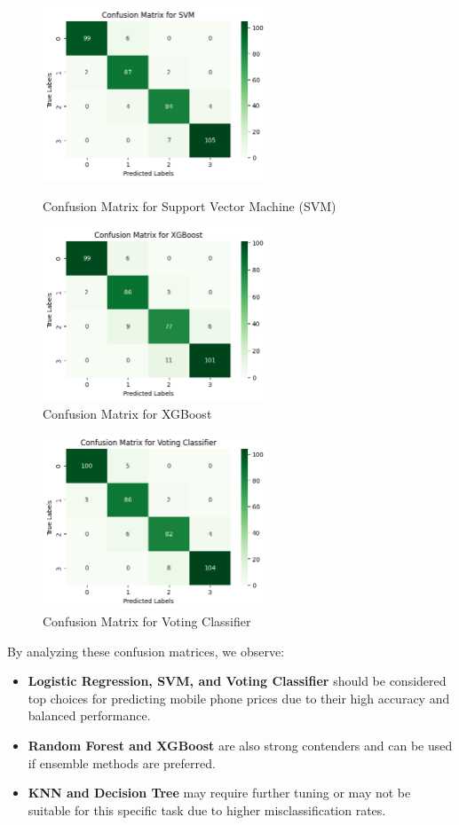 \documentclass[12pt]{report}
\begin{document}
\begin{figure}[H]
    \centering
		\begin{minipage}{0.45\textwidth}
			\centering
			\includegraphics[height=14em]{cmat_SVM.png}
			\caption{Confusion Matrix for Support Vector Machine (SVM)}
			\label{cmat_SVM}
		\end{minipage}
    \hfill
    \begin{minipage}{0.45\textwidth}
        \centering
        \includegraphics[height=14em]{cmat_XG.png}
        \caption{Confusion Matrix for XGBoost}
        \label{cmat_XG}
    \end{minipage}
\end{figure}
\begin{figure}[H]
    \centering
    \includegraphics[height=14em]{cmat_VC.png}
    \caption{Confusion Matrix for Voting Classifier}
    \label{cmat_VC}
\end{figure}

\noindent By analyzing these confusion matrices, we observe:
\vspace{-1.25em}
\begin{itemize}
	\setlength\itemsep{-1.05em}
	\item \textbf{Logistic Regression, SVM, and Voting Classifier} should be considered top choices for predicting mobile phone prices due to their high accuracy and balanced performance.
	\item \textbf{Random Forest and XGBoost} are also strong contenders and can be used if ensemble methods are preferred.
	\item \textbf{KNN and Decision Tree} may require further tuning or may not be suitable for this specific task due to higher misclassification rates.
\end{itemize}
\end{document}
